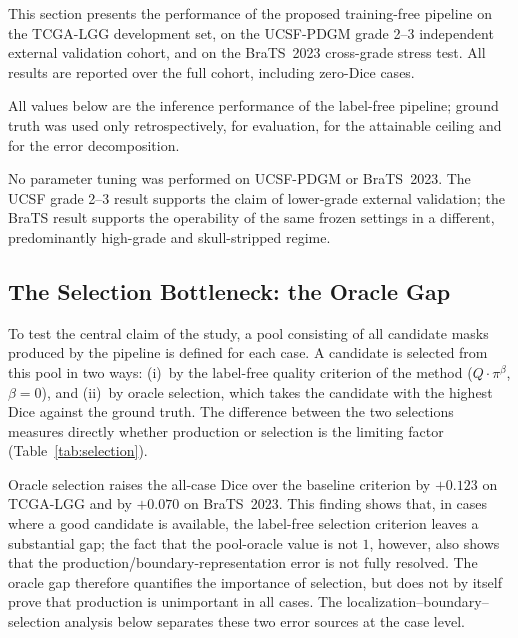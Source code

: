 \documentclass[11pt,a4paper]{article}
\begin{document}
\iffalse %

This section presents the performance of the proposed training-free pipeline on
the TCGA-LGG development set, on the UCSF-PDGM grade 2--3 independent external
validation cohort, and on the BraTS~2023 cross-grade stress test. All results are
reported over the full cohort, including zero-Dice cases.

All values below are the inference performance of the label-free pipeline; ground
truth was used only retrospectively, for evaluation, for the attainable ceiling
and for the error decomposition.

No parameter tuning was performed on UCSF-PDGM or BraTS~2023. The UCSF grade 2--3
result supports the claim of lower-grade external validation; the BraTS result
supports the operability of the same frozen settings in a different, predominantly
high-grade and skull-stripped regime.

\subsection{The Selection Bottleneck: the Oracle Gap}\label{sec:oracle-gap}

To test the central claim of the study, a pool consisting of all candidate masks
produced by the pipeline is defined for each case. A candidate is selected from
this pool in two ways: (i)~by the label-free quality criterion of the method
($Q \cdot \pi^\beta$, $\beta{=}0$), and (ii)~by oracle selection, which takes the
candidate with the highest Dice against the ground truth. The difference between
the two selections measures directly whether production or selection is the
limiting factor (Table~\ref{tab:selection}).

Oracle selection raises the all-case Dice over the baseline criterion by $+0.123$
on TCGA-LGG and by $+0.070$ on BraTS~2023. This finding shows that, in cases where
a good candidate is available, the label-free selection criterion leaves a
substantial gap; the fact that the pool-oracle value is not $1$, however, also
shows that the production/boundary-representation error is not fully resolved. The
oracle gap therefore quantifies the importance of selection, but does not by
itself prove that production is unimportant in all cases. The
localization--boundary--selection analysis below separates these two error sources
at the case level.
\end{document}
